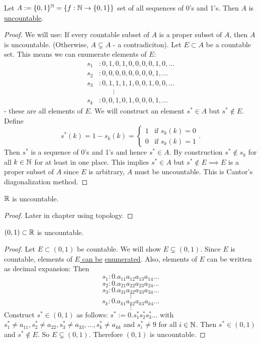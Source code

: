 \documentclass[]{article}
\begin{document}
\begin{theorem}
	Let $A:=\{0,1\}^{\mathbb{N}} = \{f:\mathbb{N}\rightarrow\{0,1\}\}$ set of all sequences of 0's and 1's.
	Then $A$ is \ul{uncountable}.
\end{theorem}
\begin{proof}
	We will use: If every countable subset of $A$ is a proper subset of $A$, then $A$ is uncountable.
	(Otherwise, $A\subsetneq A$ - a contradiciton).
	Let $E\subset A$ be a countable set. This means we can enumerate elements of $E$:
	\begin{align*}
		s_1&: 0,1,0,1,0,0,0,0,1,0,\dots \\
		s_2&: 0,0,0,0,0,0,0,0,1,\dots \\
		s_3&: 0,1,1,1,1,0,0,1,0,0,\dots \\
			&\qquad\vdots \\
		s_k&: 0,0,1,0,1,0,0,0,1,\dots
	\end{align*}
	- these are all elements of $E$.
	We will construct an element $s^*\in A$ but $s^*\notin E$.
	Define $$s^*(k) = 1-s_k(k) = \begin{cases} 1 & \text{if } s_k(k) = 0 \\ 0 & \text{if } s_k(k) = 1 \end{cases}.$$
	Then $s^*$ is a sequence of 0's and 1's and hence $s^*\in A$.
	By construction $s^*\notin s_k$ for all $k\in\mathbb{N}$ for at least in one place. 
	This implies $s^*\in A$ but $s^*\notin E \implies E$ is a proper subset of $A$ since $E$ is arbitrary, $A$ must be uncountable. This is Cantor's diagonalization method.
\end{proof}
\begin{corollary}
	$\mathbb{R}$ is uncountable.
\end{corollary}
\begin{proof}
	Later in chapter using topology.
\end{proof}

\begin{theorem}
	$(0,1)\subset \mathbb{R}$ is uncountable.
\end{theorem}
\begin{proof}
	Let $E\subset (0,1)$ be countable. We will show $E\subsetneq (0,1)$.
	Since $E$ is countable, elements of \ul{$E$ can be} \ul{enumerated}. Also, elements of $E$ can be written as decimal expansion: Then
	$$s_1: 0.a_{11}a_{12}a_{13}a_{14}\dots$$
	$$s_2: 0.a_{21}a_{22}a_{23}a_{24}\dots$$
	$$s_3: 0.a_{31}a_{32}a_{33}a_{34}\dots$$
	$$ \vdots$$
	$$s_k: 0.a_{k1}a_{k2}a_{k3}a_{k4}\dots$$
	$$ \vdots $$
	Construct $s^*\in(0,1)$ as follows: $s^* := 0.s_1^*s_2^*s_3^*\dots$ with $s_1^*\neq a_{11}, s_2^*\neq a_{22}, s_3^*\neq a_{33}, \dots, s_k^* \neq a_{kk}$ and $s_i^*\neq 9$ for all $i\in\mathbb{N}$.
	Then $s^*\in(0,1)$ and $s^*\notin E$. So $E\subsetneq (0,1)$. Therefore $(0,1)$ is uncountable.
\end{proof}
\end{document}
